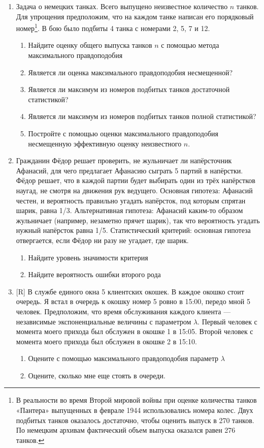 \documentclass[12pt, a4paper]{article}\usepackage[]{graphicx}\usepackage[]{color}
\begin{document}
\begin{enumerate}
					\item Задача о немецких танках. Всего выпущено неизвестное количество $n$ танков. Для упрощения предположим, что на каждом танке написан его порядковый номер\footnote{В реальности во время Второй мировой войны при оценке количества танков «Пантера» выпущенных в феврале 1944 использовались номера колес. Двух подбитых танков оказалось достаточно, чтобы оценить выпуск в 270 танков. По немецким архивам фактический объем выпуска оказался равен 276 танков. }. В бою было подбиты 4 танка с номерами 2, 5, 7 и 12.
					\begin{enumerate}
						\item Найдите оценку общего выпуска танков $n$ с помощью метода максимального правдоподобия
						\item Является ли оценка максимального правдоподобия несмещенной?
						\item Является ли максимум из номеров подбитых танков достаточной статистикой?
						\item Является ли максимум из номеров подбитых танков полной статистикой?
						\item Постройте с помощью оценки максимального правдоподобия несмещенную эффективную оценку неизвестного $n$.
					\end{enumerate}

					\item Гражданин Фёдор решает проверить, не жульничает ли напёрсточник Афанасий, для чего предлагает Афанасию сыграть 5 партий в напёрстки. Фёдор решает, что в каждой партии будет выбирать один из трёх напёрстков наугад, не смотря на движения рук ведущего. Основная гипотеза: Афанасий честен, и вероятность правильно угадать напёрсток, под которым спрятан шарик, равна 1/3. Альтернативная гипотеза: Афанасий каким-то образом жульничает (например, незаметно прячет шарик), так что вероятность угадать нужный напёрсток равна 1/5. Статистический критерий: основная гипотеза отвергается, если Фёдор ни разу не угадает, где шарик.
					\begin{enumerate}
						\item Найдите уровень значимости критерия
						\item Найдите вероятность ошибки второго рода
					\end{enumerate}

					\item $[$R] В службе единого окна 5 клиентских окошек. В каждое окошко стоит очередь. Я встал в очередь к окошку номер 5 ровно в 15:00, передо мной 5 человек. Предположим, что время обслуживания каждого клиента — независимые экспоненциальные величины с параметром $\lambda$. Первый человек с момента моего прихода был обслужен в окошке 1 в 15:05. Второй человек с момента моего прихода был обслужен в окошке 2 в 15:10.
					\begin{enumerate}
						\item Оцените с помощью максимального правдоподобия параметр $\lambda$
						\item Оцените, сколько мне еще стоять в очереди.
					\end{enumerate}

				\end{enumerate}
\end{document}
